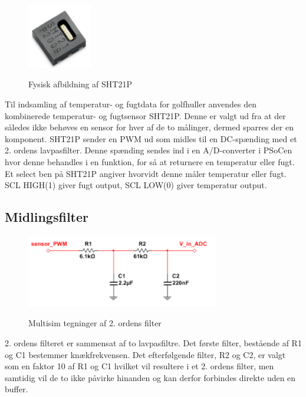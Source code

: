 
\begin{figure}[htb]
\centering
{\includegraphics[width=0.25\textwidth]{filer/design/Billeder/sht21p_fysisk}}
\caption{Fysisk afbildning af SHT21P}
\label{lab:sht_filter}
\end{figure}

Til indsamling af temperatur- og fugtdata for golfhuller anvendes den kombinerede temperatur- og fugtsensor SHT21P. Denne er valgt ud fra at der således ikke behøves en sensor for hver af de to målinger, dermed sparres der en komponent. SHT21P sender en PWM ud som midles til en DC-spænding med et 2. ordens lavpasfilter. Denne spænding sendes ind i en A/D-converter i PSoCen hvor denne behandles i en funktion, for så at returnere en temperatur eller fugt. Et select ben på SHT21P angiver hvorvidt denne måler temperatur eller fugt. SCL HIGH(1) giver fugt output, SCL LOW(0) giver temperatur output.

\subsection{Midlingsfilter}


\begin{figure}[htb]
\centering
{\includegraphics[width=0.75\textwidth]{filer/design/Billeder/sht21p_filter_pic}}
\caption{Multisim tegninger af 2. ordens filter}
\label{lab:sht_filter_pic}
\end{figure}

2. ordens filteret er sammensat af to lavpasfiltre. Det første filter, bestående af R1 og C1 bestemmer knækfrekvensen. Det efterfølgende filter, R2 og C2, er valgt som en faktor 10 af R1 og C1 hvilket vil resultere i et 2. ordens filter, men samtidig vil de to ikke påvirke hinanden og kan derfor forbindes direkte uden en buffer. 

